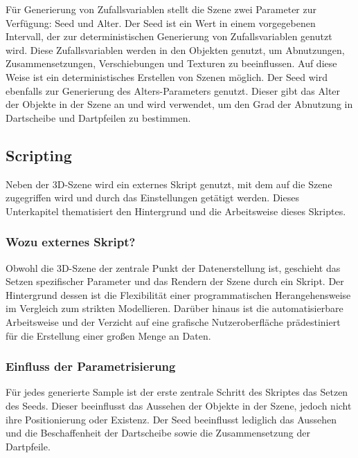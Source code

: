 Für Generierung von Zufallsvariablen stellt die Szene zwei Parameter zur Verfügung: Seed und Alter. Der Seed ist ein Wert in einem vorgegebenen Intervall, der zur deterministischen Generierung von Zufallsvariablen genutzt wird. Diese Zufallsvariablen werden in den Objekten genutzt, um Abnutzungen, Zusammensetzungen, Verschiebungen und Texturen zu beeinflussen. Auf diese Weise ist ein deterministisches Erstellen von Szenen möglich. Der Seed wird ebenfalls zur Generierung des Alters-Parameters genutzt. Dieser gibt das Alter der Objekte in der Szene an und wird verwendet, um den Grad der Abnutzung in Dartscheibe und Dartpfeilen zu bestimmen.



\subsection{Scripting}  %
\label{sec:scripting}

Neben der 3D-Szene wird ein externes Skript genutzt, mit dem auf die Szene zugegriffen wird und durch das Einstellungen getätigt werden. Dieses Unterkapitel thematisiert den Hintergrund und die Arbeitsweise dieses Skriptes.

\subsubsection{Wozu externes Skript?}

Obwohl die 3D-Szene der zentrale Punkt der Datenerstellung ist, geschieht das Setzen spezifischer Parameter und das Rendern der Szene durch ein Skript. Der Hintergrund dessen ist die Flexibilität einer programmatischen Herangehensweise im Vergleich zum strikten Modellieren. Darüber hinaus ist die automatisierbare Arbeitsweise und der Verzicht auf eine grafische Nutzeroberfläche prädestiniert für die Erstellung einer großen Menge an Daten.

\subsubsection{Einfluss der Parametrisierung}

Für jedes generierte Sample ist der erste zentrale Schritt des Skriptes das Setzen des Seeds. Dieser beeinflusst das Aussehen der Objekte in der Szene, jedoch nicht ihre Positionierung oder Existenz. Der Seed beeinflusst lediglich das Aussehen und die Beschaffenheit der Dartscheibe sowie die Zusammensetzung der Dartpfeile.

